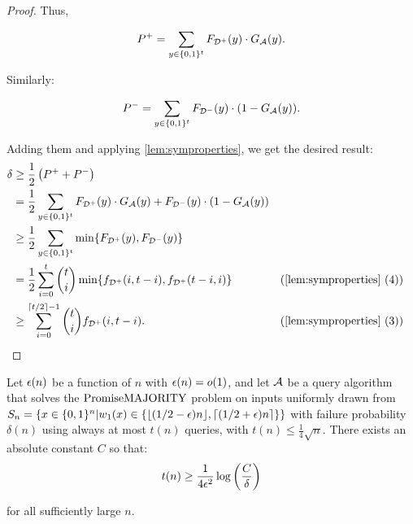 \begin{proof}
Thus, 

$$
P^+ = \sum_{y \in \{0, 1\}^t} F_{\mathcal{D}^+}(y) \cdot G_{\mathcal{A}}(y).
$$

Similarly:

$$
P^- = \sum_{y \in \{0, 1\}^t} F_{\mathcal{D}^-}(y) \cdot (1-G_{\mathcal{A}}(y)).
$$

Adding them and applying \cref{lem:symproperties}, we get the desired result:
\begin{align*}
\delta & \geq \frac{1}{2}\left(P^+ + P^-\right) \\
        & = \frac{1}{2}\sum_{y \in \{0, 1\}^t} F_{\D^+}(y) \cdot G_\A(y) + F_{\D^-}(y) \cdot (1-G_\A(y)) \\ 
        & \geq \frac{1}{2}\sum_{y \in \{0, 1\}^t} \min \{F_{\D^+}(y), F_{\D^-}(y)\} \\
        & = \frac{1}{2}\sum_{i=0}^{t} \binom{t}{i} \min \{f_{\D^+}(i, t-i), f_{\D^+}(t-i, i)\} 
        && (\text{\cref{lem:symproperties} (4)})\\
        & \geq \sum_{i=0}^{\lceil t/2 \rceil-1} \binom{t}{i} f_{\D^+}(i, t-i).
        && (\text{\cref{lem:symproperties} (3)})
\end{align*}

\end{proof}

\begin{theorem}
\label{thm:querylb}
Let $\epsilon(n)$ be a function of $n$ with $\epsilon(n) = o(1)$, and
let $\mathcal{A}$ be a query algorithm that solves the $\mathrm{PromiseMAJORITY}$ problem on inputs uniformly drawn from 
$S_n = \{x \in \{0, 1\}^n | w_1(x) \in \{\lfloor(1/2-\epsilon)n\rfloor, \lceil(1/2+\epsilon)n\rceil\}\}$ 
with failure probability $\delta(n)$ using always at most $t(n)$ queries, with $t(n) \leq \frac{1}{4}\sqrt{n}$. 
There exists an absolute constant $C$ so that: 
$$
t(n) \geq \frac{1}{4\epsilon^2} \log \left(\frac{C}{\delta}\right)
$$

for all sufficiently large $n$.
\end{theorem}

